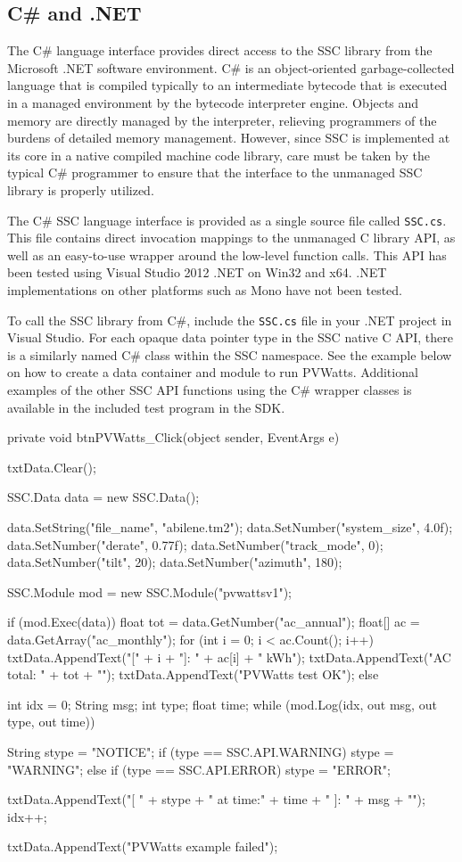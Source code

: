 \documentclass{scrartcl} %
\newcommand{\+}{\discretionary{\mbox{\scriptsize$\hookleftarrow$}}{}{}}
\begin{document}
\subsection{C\# and .NET}

The C\# language interface provides direct access to the SSC library from the Microsoft .NET software environment.  C\# is an object-oriented garbage-collected language that is compiled typically to an intermediate bytecode that is executed in a managed environment by the bytecode interpreter engine.  Objects and memory are directly managed by the interpreter, relieving programmers of the burdens of detailed memory management.  However, since SSC is implemented at its core in a native compiled machine code library, care must be taken by the typical C\# programmer to ensure that the interface to the unmanaged SSC library is properly utilized.

The C\# SSC language interface is provided as a single source file called \texttt{SSC.cs}.  This file contains direct invocation mappings to the unmanaged C library API, as well as an easy-to-use wrapper around the low-level function calls.  This API has been tested using Visual Studio 2012 .NET on Win32 and x64.  .NET implementations on other platforms such as Mono have not been tested.

To call the SSC library from C\#, include the \texttt{SSC.cs} file in your .NET project in Visual Studio. For each opaque data pointer type in the SSC native C API, there is a similarly named C\# class within the SSC namespace.  See the example below on how to create a data container and module to run PVWatts.  Additional examples of the other SSC API functions using the C\# wrapper classes is available in the included test program in the SDK.

\begin{verbatimtab}[4]
private void btnPVWatts_Click(object sender, EventArgs e)
{
	txtData.Clear();

	SSC.Data data = new SSC.Data();

	data.SetString("file_name", "abilene.tm2");
	data.SetNumber("system_size", 4.0f);
	data.SetNumber("derate", 0.77f);
	data.SetNumber("track_mode", 0);
	data.SetNumber("tilt", 20);
	data.SetNumber("azimuth", 180);

	SSC.Module mod = new SSC.Module("pvwattsv1");

	if (mod.Exec(data))
	{
		float tot = data.GetNumber("ac_annual");
		float[] ac = data.GetArray("ac_monthly");
		for (int i = 0; i < ac.Count(); i++)
			txtData.AppendText("[" + i + "]: " + ac[i] + " kWh\n");
		txtData.AppendText("AC total: " + tot + "\n");
		txtData.AppendText("PVWatts test OK\n");
	}
	else
	{
		int idx = 0;
		String msg;
		int type;
		float time;
		while (mod.Log(idx, out msg, out type, out time))
		{
			String stype = "NOTICE";
			if (type == SSC.API.WARNING) stype = "WARNING";
			else if (type == SSC.API.ERROR) stype = "ERROR";

			txtData.AppendText("[ " + stype + " at time:" + time + " ]: " 
                               + msg + "\n");
			idx++;
		}

		txtData.AppendText("PVWatts example failed\n");
	}
}


\end{verbatimtab}
\end{document}
